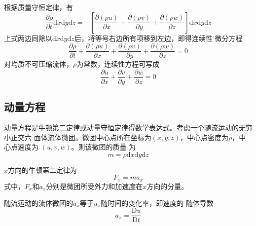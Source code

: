 根据质量守恒定律，有
\begin{equation}
  \frac{\partial \rho}{\partial  t}\mathrm{d}x\mathrm{d}y\mathrm{d}z
  =
  -
  \left[
    \frac {\partial (\rho u)} {\partial x}
    +
    \frac {\partial (\rho v)} {\partial y}
    +
    \frac {\partial (\rho w)} {\partial z}
  \right]
  \mathrm{d}x\mathrm{d}y\mathrm{d}z
\end{equation}
上式两边同除以$\mathrm{d}x\mathrm{d}y\mathrm{d}z$后，将等号右边所有项移到左边，即得连续性
微分方程
\begin{equation}
  \frac{\partial \rho}{\partial  t}
  +
  \frac{\partial (\rho u)}{\partial  x}
  +
  \frac{\partial (\rho v)}{\partial  y}
  +
  \frac{\partial (\rho w)}{\partial  z}
  =
  0
\end{equation}
对均质不可压缩流体，$\rho$为常数，连续性方程可写成
\begin{equation}
  \frac{\partial u}{\partial  x}
  +
  \frac{\partial v}{\partial  y}
  +
  \frac{\partial w}{\partial  z}
  =
  0
  \label{EqCGe_NS_Ce}
\end{equation}

\subsection{动量方程}
动量方程是牛顿第二定律或动量守恒定律得数学表达式。考虑一个随流运动的无穷小正交六
面体流体微团。微团中心点所在坐标为$(x,y,z)$，中心点密度为$\rho$，中心点速度为
$(u, v, w)$。则该微团的质量
为
\begin{equation}
  m = \rho\mathrm{d}x\mathrm{d}y\mathrm{d}z
\end{equation}

$x$方向的牛顿第二定律为
\begin{equation}
  F_{x} = ma_{x}
  \label{EqCGe_Nt_x}
\end{equation}
式中，$F_{x}$和$a_{x}$分别是微团所受外力和加速度在$x$方向的分量。

随流运动的流体微团的$a_{x}$等于$u_{x}$随时间的变化率，即速度的
随体导数
\begin{equation}
  a_{x} =
  \frac{\mathrm{D}u}{\mathrm{D}t}
  \label{EqCGe_Ac_x}
\end{equation}


